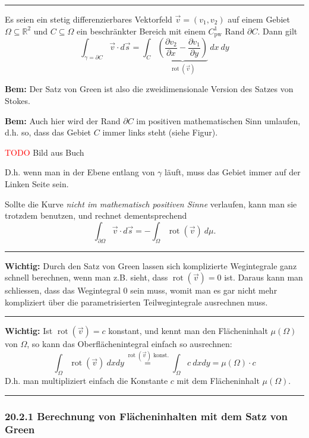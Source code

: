 \documentclass[a4paper,landscape,8pt]{extarticle}
\newcommand{\R}{\mathbb{R}}
\newcommand{\todo}{\textcolor{red}{TODO }}
\newcommand{\sep}{\vspace{5pt}\noindent\hrule\vspace{5pt}}
\newcommand{\Bem}{\textbf{Bem: }}
\newcommand{\Wichtig}{\textbf{Wichtig: }}
\DeclareMathOperator{\rot}{rot}
\begin{document}
\begin{multicols*}{4}
\sep

\Satz Es seien ein stetig differenzierbares Vektorfeld $\vec{v}=(v_1,v_2)$ auf
einem Gebiet $\Omega\subseteq\R^2$ und $C\subseteq \Omega$ ein beschränkter
Bereich mit einem $C^1_{\text{pw}}$ Rand $\partial C$. Dann gilt
\[
\int_{\gamma=\partial C} \vec{v}\cdot d\vec{s}
=\int_C \underbrace{\left(\frac{\partial v_2}{\partial x}- \frac{\partial
v_1}{\partial y}\right)}_{\rot(\vec{v})} \ dx \ dy
\]

\Bem Der Satz von Green ist also die zweidimensionale Version des Satzes von
Stokes.

\Bem Auch hier wird der Rand $\partial C$ im positiven mathematischen Sinn
umlaufen, d.h. so, dass das Gebiet $C$ immer links steht (siehe Figur).

\begin{warmup}
\todo Bild aus Buch
\end{warmup}

D.h. wenn man in der Ebene entlang von $\gamma$ läuft, muss das Gebiet immer auf
der Linken Seite sein.

\Trick Sollte die Kurve \emph{nicht im mathematisch positiven Sinne} verlaufen,
kann man sie trotzdem benutzen, und rechnet dementsprechend
\[
\int_{\partial\Omega} \vec{v} \cdot d\vec{s} =
- \int_{\Omega} \rot(\vec{v}) \ d\mu.
\]

\sep

\Wichtig Durch den Satz von Green lassen sich komplizierte Wegintegrale ganz
schnell berechnen, wenn man z.B. sieht, dass $\rot(\vec{v})= 0$ ist. Daraus kann
man schliessen, dass das Wegintegral $0$ sein muss, womit man es gar nicht mehr
kompliziert über die parametrisierten Teilwegintegrale ausrechnen muss.

\sep

\Wichtig Ist $\rot(\vec{v})=c$ konstant, und kennt man den Flächeninhalt
$\mu(\Omega)$ von $\Omega$, so kann das Oberflächenintegral einfach so
ausrechnen:
\[
\int_{\Omega}\rot(\vec{v}) \ dx dy \stackrel{\rot(\vec{v}) \text{ konst.}}{=}
\int_{\Omega} c \ dx dy
= \mu(\Omega) \cdot c
\]
D.h. man multipliziert einfach die Konstante $c$ mit dem Flächeninhalt
$\mu(\Omega)$.

\sep

\subsubsection{20.2.1 Berechnung von Flächeninhalten mit dem Satz von Green}


\end{multicols*}
\end{document}
